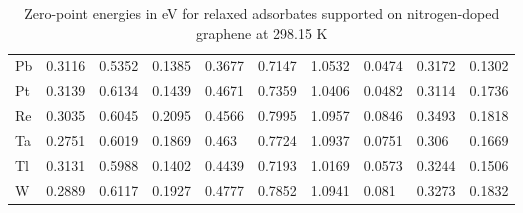 \begin{table}[h]
{\begin{tabular}{*{10}{l}}
      Pb & 0.3116 & 0.5352 & 0.1385 & 0.3677 & 0.7147 & 1.0532 & 0.0474 & 0.3172 & 0.1302 \\
      Pt & 0.3139 & 0.6134 & 0.1439 & 0.4671 & 0.7359 & 1.0406 & 0.0482 & 0.3114 & 0.1736 \\
      Re & 0.3035 & 0.6045 & 0.2095 & 0.4566 & 0.7995 & 1.0957 & 0.0846 & 0.3493 & 0.1818 \\
      Ta & 0.2751 & 0.6019 & 0.1869 & 0.463  & 0.7724 & 1.0937 & 0.0751 & 0.306  & 0.1669 \\
      Tl & 0.3131 & 0.5988 & 0.1402 & 0.4439 & 0.7193 & 1.0169 & 0.0573 & 0.3244 & 0.1506 \\
      W  & 0.2889 & 0.6117 & 0.1927 & 0.4777 & 0.7852 & 1.0941 & 0.081  & 0.3273 & 0.1832 \\
      \hline
  \end{tabular}
  }
  \caption{Zero-point energies in eV for relaxed adsorbates supported on nitrogen-doped graphene at 298.15 K}
  \label{si_table9}
\end{table}


